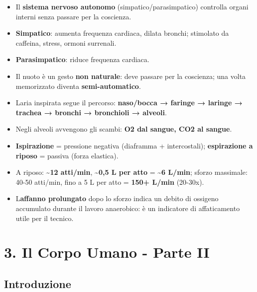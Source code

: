 \documentclass[a4paper,11pt]{article}
\begin{document}
\begin{itemize}
            coscienti (azioni volontarie); quelle che si fermano al
            \textbf{cervelletto} controllano postura ed equilibrio in modo
            automatico.
      \item
            Il \textbf{sistema nervoso autonomo} (simpatico/parasimpatico)
            controlla organi interni senza passare per la coscienza.
      \item
            \textbf{Simpatico}: aumenta frequenza cardiaca, dilata bronchi;
            stimolato da caffeina, stress, ormoni surrenali.
      \item
            \textbf{Parasimpatico}: riduce frequenza cardiaca.
      \item
            Il nuoto è un gesto \textbf{non naturale}: deve passare per la
            coscienza; una volta memorizzato diventa \textbf{semi-automatico}.
      \item
            L\textquotesingle aria inspirata segue il percorso: \textbf{naso/bocca
                  → faringe → laringe → trachea → bronchi → bronchioli → alveoli}.
      \item
            Negli alveoli avvengono gli scambi: \textbf{O2 dal sangue, CO2 al
                  sangue}.
      \item
            \textbf{Ispirazione} = pressione negativa (diaframma + intercostali);
            \textbf{espirazione a riposo} = passiva (forza elastica).
      \item
            A riposo: \textasciitilde{}\textbf{12 atti/min},
            \textasciitilde{}\textbf{0,5 L per atto} = \textasciitilde{}\textbf{6
                  L/min}; sforzo massimale: 40-50 atti/min, fino a 5 L per atto =
            \textbf{150+ L/min} (20-30x).
      \item
            L\textquotesingle{}\textbf{affanno prolungato} dopo lo sforzo indica
            un debito di ossigeno accumulato durante il lavoro anaerobico: è un
            indicatore di affaticamento utile per il tecnico.
\end{itemize}

\section{3. Il Corpo Umano - Parte II}\label{il-corpo-umano---parte-ii}

\subsection{Introduzione}\label{introduzione-2}
\end{document}
